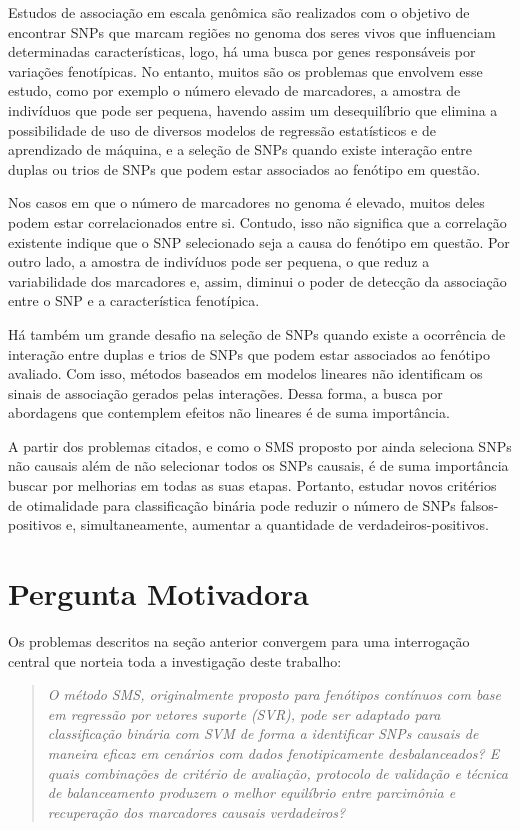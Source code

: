 \documentclass[
    12pt,
    a4paper,
    oneside,
    english,
    french,
    spanish,
    brazil
    ]{abntex2}
\begin{document}
Estudos de associação em escala genômica são realizados com o objetivo de encontrar SNPs que marcam regiões no genoma dos seres vivos que influenciam determinadas características, logo, há uma busca por genes responsáveis por variações fenotípicas. No entanto, muitos são os problemas que envolvem esse estudo, como por exemplo o número elevado de marcadores, a amostra de indivíduos que pode ser pequena, havendo assim um desequilíbrio que elimina a possibilidade de uso de diversos modelos de regressão estatísticos e de aprendizado de máquina, e a seleção de SNPs quando existe interação entre duplas ou trios de SNPs que podem estar associados ao fenótipo em questão.

Nos casos em que o número de marcadores no genoma é elevado, muitos deles podem estar correlacionados entre si. Contudo, isso não significa que a correlação existente indique que o SNP selecionado seja a causa do fenótipo em questão. Por outro lado, a amostra de indivíduos pode ser pequena, o que reduz a variabilidade dos marcadores e, assim, diminui o poder de detecção da associação entre o SNP e a característica fenotípica.

Há também um grande desafio na seleção de SNPs quando existe a ocorrência de interação entre duplas e trios de SNPs que podem estar associados ao fenótipo avaliado. Com isso, métodos baseados em modelos lineares não identificam os sinais de associação gerados pelas interações. Dessa forma, a busca por abordagens que contemplem efeitos não lineares é de suma importância.

A partir dos problemas citados, e como o SMS proposto por  ainda seleciona SNPs não causais além de não selecionar todos os SNPs causais, é de suma importância buscar por melhorias em todas as suas etapas. Portanto, estudar novos critérios de otimalidade para classificação binária pode reduzir o número de SNPs falsos-positivos e, simultaneamente, aumentar a quantidade de verdadeiros-positivos.

\section{Pergunta Motivadora}

Os problemas descritos na seção anterior convergem para uma interrogação central que norteia toda a investigação deste trabalho:

\begin{quote}
\textit{O método SMS, originalmente proposto para fenótipos contínuos com base em regressão por vetores suporte (SVR), pode ser adaptado para classificação binária com SVM de forma a identificar SNPs causais de maneira eficaz em cenários com dados fenotipicamente desbalanceados? E quais combinações de critério de avaliação, protocolo de validação e técnica de balanceamento produzem o melhor equilíbrio entre parcimônia e recuperação dos marcadores causais verdadeiros?}
\end{quote}
\end{document}
